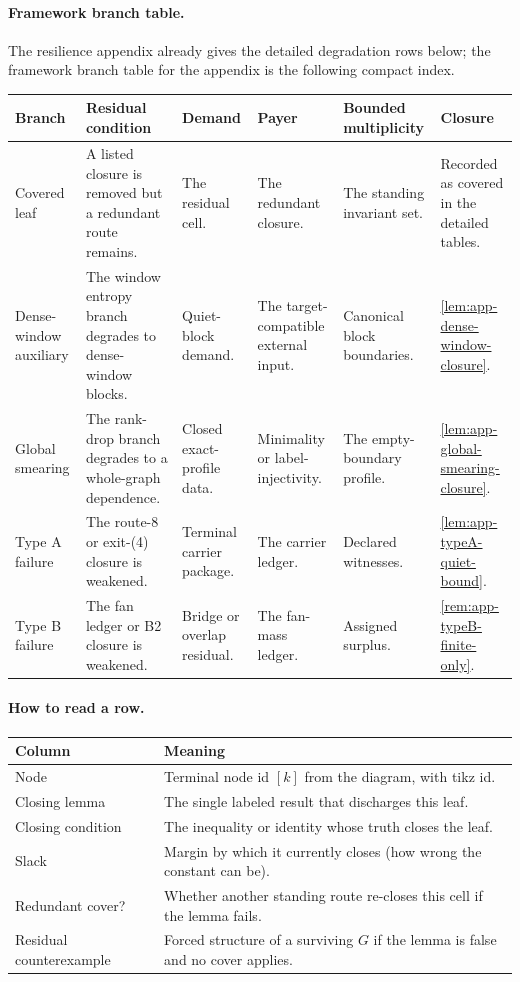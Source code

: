 \documentclass[11pt]{article}
\newcommand{\FrameworkBranchTableHeader}{%
\toprule
\textbf{Branch} & \textbf{Residual condition} & \textbf{Demand} & \textbf{Payer} & \textbf{Bounded multiplicity} & \textbf{Closure}\\
\midrule
}
\begin{document}
\paragraph{Framework branch table.}
The resilience appendix already gives the detailed degradation rows below; the
framework branch table for the appendix is the following compact index.
\begin{longtable}{L{0.13\textwidth} L{0.19\textwidth} L{0.14\textwidth} L{0.14\textwidth} L{0.17\textwidth} L{0.17\textwidth}}
\FrameworkBranchTableHeader
Covered leaf
&
A listed closure is removed but a redundant route remains.
&
The residual cell.
&
The redundant closure.
&
The standing invariant set.
&
Recorded as covered in the detailed tables.
\\
\addlinespace
Dense-window auxiliary
&
The window entropy branch degrades to dense-window blocks.
&
Quiet-block demand.
&
The target-compatible external input.
&
Canonical block boundaries.
&
\cref{lem:app-dense-window-closure}.
\\
\addlinespace
Global smearing
&
The rank-drop branch degrades to a whole-graph dependence.
&
Closed exact-profile data.
&
Minimality or label-injectivity.
&
The empty-boundary profile.
&
\cref{lem:app-global-smearing-closure}.
\\
\addlinespace
Type A failure
&
The route-8 or exit-\textup{(4)} closure is weakened.
&
Terminal carrier package.
&
The carrier ledger.
&
Declared witnesses.
&
\cref{lem:app-typeA-quiet-bound}.
\\
\addlinespace
Type B failure
&
The fan ledger or B2 closure is weakened.
&
Bridge or overlap residual.
&
The fan-mass ledger.
&
Assigned surplus.
&
\cref{rem:app-typeB-finite-only}.
\\
\bottomrule
\end{longtable}

\paragraph{How to read a row.}
{\small
\begin{longtable}{L{0.22\textwidth} L{0.70\textwidth}}
\toprule
\textbf{Column} & \textbf{Meaning} \\
\midrule
\endhead
Node & Terminal node id $[k]$ from the diagram, with tikz id. \\
Closing lemma & The single labeled result that discharges this leaf. \\
Closing condition & The inequality or identity whose truth closes the leaf. \\
Slack & Margin by which it currently closes (how wrong the constant can be). \\
Redundant cover? & Whether another standing route re-closes this cell if the lemma fails. \\
Residual counterexample & Forced structure of a surviving $G$ if the lemma is false and no cover applies. \\
\bottomrule
\end{longtable}
}
\end{document}
